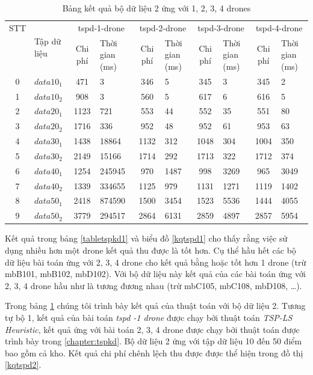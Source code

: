 \documentclass[a4paper,12pt]{report}
\begin{document}
\footnotesize
\begin{longtable}{|c|l|c|p{1.5cm}|c|p{1cm}|c|p{1cm}|c|p{1cm}|}
\caption{Bảng kết quả bộ dữ liệu 2 ứng với 1, 2, 3, 4 drones}
\label{tabletspkd2}\\ 
\toprule
STT&\multirow{2}{*}{Tập dữ liệu} & \multicolumn{2}{c|}{tspd-1-drone } &\multicolumn{2}{c|}{tspd-2-drone } &\multicolumn{2}{c|}{tspd-3-drone }&\multicolumn{2}{c|}{tspd-4-drone } \\
\cline{3-10} 
&&Chi phí &Thời gian (ms)&Chi phí &Thời gian (ms)&Chi phí &Thời gian (ms)&Chi phí &Thời gian (ms)\\
\midrule
\toprule
0&$data 10_1$&471& 3
&346& 5
&345& 3
&345& 2\\
\hline
1&$data 10_2$&908& 3
&560& 5
&617& 6
&616& 5 \\
\hline
2&$data 20_1$&1123& 721
&553& 44
&552& 35
&551& 80\\
\hline
3&$data 20_2$&1716&  336
&952& 48
&952& 61
&953& 63 \\
\hline
4&$data 30_1$&1438& 18864
&1132& 312
&1048& 304
&1004& 350 \\
\hline
5&$data 30_2$&2149& 15166
&1714& 292
&1713& 322
&1712& 374 \\
\hline

6&$data 40_1$&1254& 245945
&970& 1487
&998&  3269
&965& 3049 \\
\hline
7&$data 40_2$&1339& 334655
&1125& 979
&1131& 1271
&1119 &1402 \\
\hline

8&$data 50_1$&2418& 874590
&1500& 3454
&1523& 5536
&1444& 4055 \\
\hline

9&$data 50_2$ & 3779 & 294517
& 2864 &6131
&2859 &4897
&2857 &5954 \\
\hline





\end{longtable}
\normalsize
Kết quả trong bảng \ref{tabletspkd1} và biểu đồ \ref{kqtspd1} cho thấy rằng việc sử dụng nhiều hơn một drone kết quả thu được là tốt hơn. Cụ thể hầu hết các bộ dữ liệu bài toán ứng với 2, 3, 4 drone cho kết quả bằng hoặc tốt hơn 1 drone (trừ mbB101, mbB102, mbD102). Với bộ dữ liệu này kết quả của các bài toán ứng với 2, 3, 4 drone hầu như là tương đương nhau (trừ mbC105, mbC108, mbD108, \dots).

Trong bảng \ref{tabletspkd2} chúng tôi trình bày kết quả của thuật toán với bộ dữ liệu 2. Tương tự bộ 1, kết quả của bài toán \textit{tspd -1 drone } được chạy bởi thuật toán \textit{TSP-LS Heuristic}, kết quả ứng với bài toán 2, 3, 4 drone được chạy bởi thuật toán được trình bày trong \ref{chapter:tspkd}. Bộ dữ liệu 2 ứng với tập dữ liệu 10 đến 50 điểm bao gồm cả kho. Kết quả chi phí chênh lệch thu được được thể hiện trong đồ thị \ref{kqtspd2}.\\
\end{document}
